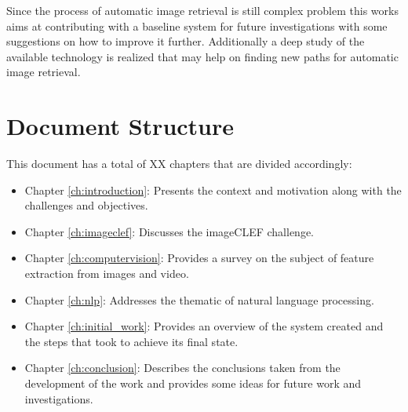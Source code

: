 Since the process of automatic image retrieval is still complex problem this works aims at contributing with a baseline system for future investigations with some suggestions on how to improve it further. Additionally a deep study of the available technology is realized that may help on finding new paths for automatic image retrieval.


\section{Document Structure}
This document has a total of XX chapters that are divided accordingly:




\begin{itemize}
  \item Chapter \ref{ch:introduction}: Presents the context and motivation along with the challenges and objectives.
  \item Chapter \ref{ch:imageclef}: Discusses the imageCLEF challenge.
  \item Chapter \ref{ch:computervision}: Provides a survey on the subject of feature extraction from images and video.
  \item Chapter \ref{ch:nlp}: Addresses the thematic of natural language processing.
  \item Chapter \ref{ch:initial_work}: Provides an overview of the system created and the steps that took to achieve its final state.
  \item Chapter \ref{ch:conclusion}: Describes the conclusions taken from the development of the work and provides some ideas for future work and investigations.
  
 
 
\end{itemize}

